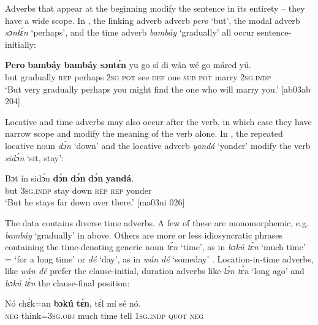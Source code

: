 Adverbs that appear at the beginning modify the sentence in its entirety – they have a wide scope. In , the linking adverb adverb \textit{pero} ‘but’, the modal adverb \textit{sɔntɛ́n} ‘perhaps’, and the time adverb \textit{bambáy} ‘gradually’ all occur sentence-initially:


\ea%
    \label{ex:key:840}
    \gll \textbf{Pero}  \textbf{bambáy}    \textbf{bambáy}  \textbf{sɔntɛ́n}  yu  go  sí  di  wán  
wé  go  máred  yú.    \\
but    gradually  \textsc{rep}    perhaps  \textsc{2sg}  \textsc{pot}  see  \textsc{def}  one  
\textsc{sub}  \textsc{pot}  marry  \textsc{2sg.indp}\\

\glt ‘But very gradually perhaps you might find the one who will marry you.’ [ab03ab 204]
\z

Locative and time adverbs may also occur after the verb, in which case they have narrow scope and modify the meaning of the verb alone. In , the repeated locative noun \textit{dɔ́n} ‘down’ and the locative adverb \textit{yandá} ‘yonder’ modify the verb \textit{sidɔ́n} ‘sit, stay’: 


\ea%
    \label{ex:key:841}
    \gll Bɔt  ín    sidɔ́n  \textbf{dɔ́n}    \textbf{dɔ́n}  \textbf{dɔ́n}  \textbf{yandá}.\\
but  \textsc{3sg.indp}  stay    down  \textsc{rep}  \textsc{rep}  yonder\\

\glt ‘But he stays far down over there.’ [ma03ni 026]
\z

The data contains diverse time adverbs. A few of these are monomorphemic, e.g. \textit{bambáy} ‘gradually’ in  above. Others are more or less idiosyncratic phrases containing the time-denoting generic noun \textit{tɛ́n} ‘time’, as in \textit{bɔkú tɛ́n} ‘much time’ = ‘for a long time’  or \textit{dé} ‘day’, as in \textit{wán dé} ‘someday’ . Location{\fff}-in-time adverbs, like \textit{wán dé} prefer the clause-initial, duration adverbs like \textit{lɔ́n tɛ́n} ‘long ago’ and \textit{bɔkú tɛ́n} the clause-final position: 


\ea%
    \label{ex:key:842}
    \gll Nó  chɛ́k=an    \textbf{bɔkú}  \textbf{tɛ́n},    tɛ́l  mí    sé    nó.\\
\textsc{neg}  think=\textsc{3sg.obj}  much  time    tell  \textsc{1sg.indp}  \textsc{quot}    \textsc{neg}\\


